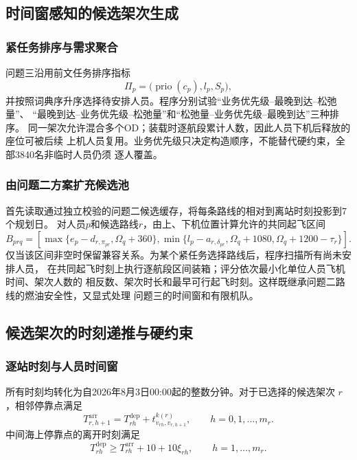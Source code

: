 \documentclass[UTF8,a4paper,zihao=5]{ctexart}
\begin{document}
\subsection{时间窗感知的候选架次生成}

\subsubsection{紧任务排序与需求聚合}

问题三沿用前文任务排序指标
\begin{equation}
  \Pi_p=\bigl(\operatorname{prio}(c_p),l_p,S_p\bigr),
  \label{eq:q3-route-priority}
\end{equation}
并按照词典序升序选择待安排人员。程序分别试验“业务优先级--最晚到达--松弛量”、
“最晚到达--业务优先级--松弛量”和“松弛量--业务优先级--最晚到达”三种排序。
同一架次允许混合多个OD；装载时逐航段累计人数，因此人员下机后释放的座位可被后续
上机人员复用。业务优先级只决定构造顺序，不能替代硬约束，全部3840名非临时人员仍须
逐人覆盖。

\subsubsection{由问题二方案扩充候选池}

首先读取通过独立校验的问题二候选缓存，将每条路线的相对到离站时刻投影到7个规划日。
对人员$p$和候选路线$r$，由上、下机位置计算允许的共同起飞区间
\begin{equation}
  B_{prq}=\left[\max\{e_p-d_{r,\pi_{pr}},\Omega_q+360\},
  \min\{l_p-a_{r,\delta_{pr}},\Omega_q+1080,
  \Omega_q+1200-\tau_r\}\right].
  \label{eq:q3-start-interval}
\end{equation}
仅当该区间非空时保留兼容关系。为某个紧任务选择路线后，程序扫描所有尚未安排人员，
在共同起飞时刻上执行逐航段区间装箱；评分依次最小化单位人员飞机时间、架次人数的
相反数、架次时长和最早可行起飞时刻。这样既继承问题二路线的燃油安全性，又显式处理
问题三的时间窗和有限机队。

\subsection{候选架次的时刻递推与硬约束}

\subsubsection{逐站时刻与人员时间窗}

所有时刻均转化为自2026年8月3日00:00起的整数分钟。对于已选择的候选架次
$r$，相邻停靠点满足
\begin{equation}
  T_{r,h+1}^{\mathrm{arr}}
  =T_{rh}^{\mathrm{dep}}
  +t_{v_{rh},v_{r,h+1}}^{k(r)},
  \qquad h=0,1,\ldots,m_r.
  \label{eq:q3-time-recursion}
\end{equation}
中间海上停靠点的离开时刻满足
\begin{equation}
  T_{rh}^{\mathrm{dep}}
  \ge T_{rh}^{\mathrm{arr}}+10+10\xi_{rh},
  \qquad h=1,\ldots,m_r.
  \label{eq:q3-dwell-wait}
\end{equation}
\end{document}
